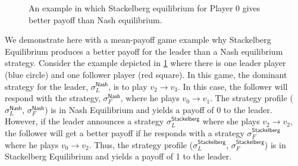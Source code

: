 \begin{figure}
    \centering
    \caption{An example in which Stackelberg equilibrium for Player $0$ gives better payoff than Nash equilibrium.}
    \label{fig:nash_vs_stackelberg}
\end{figure}

We demonstrate here with a mean-payoff game example why Stackelberg Equilibrium produces a better payoff for the leader than a Nash equilibrium strategy. Consider the example depicted in \cref{fig:nash_vs_stackelberg} where there is one leader player (blue circle) and one follower player (red square). In this game, the dominant strategy for the leader, $\sigma_L^{\mathsf{Nash}}$, is to play $v_2 \to v_3$. In this case, the follower will respond with the strategy, $\sigma_F^{\mathsf{Nash}}$, where he plays $v_0 \to v_1$. The strategy profile ($\sigma_L^{\mathsf{Nash}}$, $\sigma_F^{\mathsf{Nash}}$) is in Nash Equilibrium and yields a payoff of 0 to the leader. However, if the leader announces a strategy $\sigma_L^{\mathsf{Stackelberg}}$ where she plays $v_2 \to v_2$, the follower will get a better payoff if he responds with a strategy $\sigma_F^{\mathsf{Stackelberg}}$ where he plays $v_0 \to v_2$. Thus, the strategy profile ($\sigma_L^{\mathsf{Stackelberg}}$, $\sigma_F^{\mathsf{Stackelberg}}$) is in Stackelberg Equilibrium and yields a payoff of 1 to the leader.

